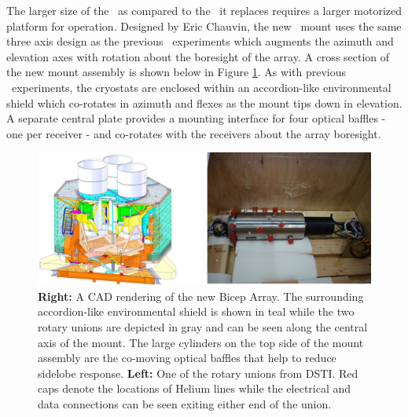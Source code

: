 \documentclass[]{spie}  %
\begin{document}
The larger size of the \biceparray\ as compared to the \keckarray\ it replaces
requires a larger motorized platform for operation. Designed by Eric Chauvin,
the new \biceparray\ mount uses the same three axis design as the previous
\bk\ experiments which augments the azimuth and elevation axes with
rotation about the boresight of the array. A
cross section of the new mount assembly is shown below in Figure
\ref{fig:bamount}. As with previous \bk\ experiments, the cryostats
are enclosed within an accordion-like environmental shield which co-rotates in
azimuth and flexes as the mount tips down in elevation. A separate central
plate provides a mounting interface for four optical baffles - one per
receiver - and co-rotates with the receivers about the array boresight.


\begin{figure} [hb]
	\begin{center}
		\includegraphics[scale=0.65]{mount.png}
	\end{center}
	\caption{\textbf{Right:} A CAD rendering of the new Bicep Array. The surrounding
	accordion-like environmental shield is shown in teal while the two rotary
	unions are depicted in gray and can be seen along the central axis of the
	mount. The large cylinders on the top side of the mount assembly are the co-moving optical baffles that help to reduce sidelobe response. \textbf{Left:} One of the rotary unions from DSTI. Red caps
	denote the locations of Helium lines while the electrical and data connections
	can be seen exiting either end of the union.}
	\label{fig:bamount}
\end{figure}

\clearpage
\end{document}
